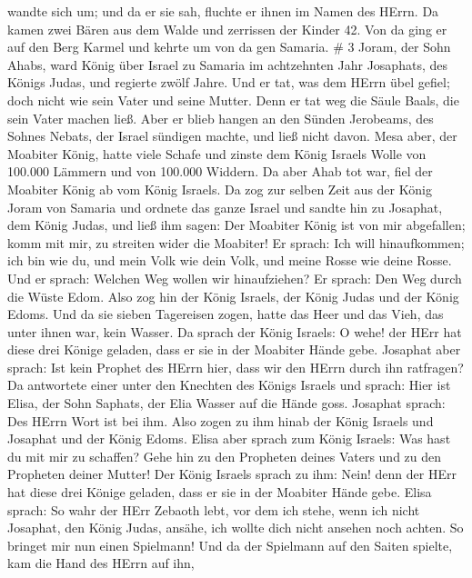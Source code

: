 wandte sich um; und da er sie sah, fluchte er ihnen im Namen des HErrn.
Da kamen zwei Bären aus dem Walde und zerrissen der Kinder 42.
 Von da ging er auf den Berg Karmel und kehrte um von da
gen Samaria. \# 3  Joram, der Sohn Ahabs, ward König über
Israel zu Samaria im achtzehnten Jahr Josaphats, des Königs Judas, und
regierte zwölf Jahre.  Und er tat, was dem HErrn übel
gefiel; doch nicht wie sein Vater und seine Mutter. Denn er tat weg die
Säule Baals, die sein Vater machen ließ.  Aber er blieb
hangen an den Sünden Jerobeams, des Sohnes Nebats, der Israel sündigen
machte, und ließ nicht davon.  Mesa aber, der Moabiter
König, hatte viele Schafe und zinste dem König Israels Wolle von 100.000
Lämmern und von 100.000 Widdern.  Da aber Ahab tot war, fiel
der Moabiter König ab vom König Israels.  Da zog zur selben
Zeit aus der König Joram von Samaria und ordnete das ganze Israel
 und sandte hin zu Josaphat, dem König Judas, und ließ ihm
sagen: Der Moabiter König ist von mir abgefallen; komm mit mir, zu
streiten wider die Moabiter! Er sprach: Ich will hinaufkommen; ich bin
wie du, und mein Volk wie dein Volk, und meine Rosse wie deine Rosse.
 Und er sprach: Welchen Weg wollen wir hinaufziehen? Er
sprach: Den Weg durch die Wüste Edom.  Also zog hin der
König Israels, der König Judas und der König Edoms. Und da sie sieben
Tagereisen zogen, hatte das Heer und das Vieh, das unter ihnen war, kein
Wasser.  Da sprach der König Israels: O wehe! der HErr hat
diese drei Könige geladen, dass er sie in der Moabiter Hände gebe.
 Josaphat aber sprach: Ist kein Prophet des HErrn hier,
dass wir den HErrn durch ihn ratfragen? Da antwortete einer unter den
Knechten des Königs Israels und sprach: Hier ist Elisa, der Sohn
Saphats, der Elia Wasser auf die Hände goss.  Josaphat
sprach: Des HErrn Wort ist bei ihm. Also zogen zu ihm hinab der König
Israels und Josaphat und der König Edoms.  Elisa aber
sprach zum König Israels: Was hast du mit mir zu schaffen? Gehe hin zu
den Propheten deines Vaters und zu den Propheten deiner Mutter! Der
König Israels sprach zu ihm: Nein! denn der HErr hat diese drei Könige
geladen, dass er sie in der Moabiter Hände gebe.  Elisa
sprach: So wahr der HErr Zebaoth lebt, vor dem ich stehe, wenn ich nicht
Josaphat, den König Judas, ansähe, ich wollte dich nicht ansehen noch
achten.  So bringet mir nun einen Spielmann! Und da der
Spielmann auf den Saiten spielte, kam die Hand des HErrn auf ihn,

